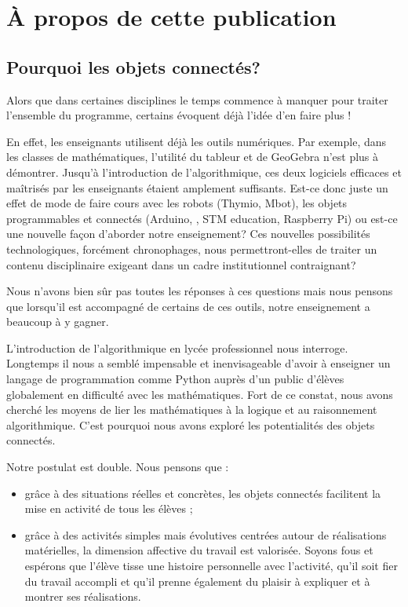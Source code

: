 \pagestyle{plain}

\section{À propos de cette publication}



\subsection{Pourquoi les objets connectés?}


Alors que dans certaines disciplines le temps commence à manquer pour traiter l'ensemble du programme, certains évoquent déjà l'idée d'en faire plus !

En effet, les enseignants utilisent déjà les outils numériques. Par exemple, dans les classes de mathématiques, l'utilité du tableur et de GeoGebra n'est plus à démontrer. Jusqu'à l'introduction de l'algorithmique, ces deux logiciels efficaces et maîtrisés par les enseignants étaient amplement suffisants.
Est-ce donc juste un effet de mode de faire cours avec les robots (Thymio, Mbot), les objets  programmables et connectés (Arduino, \mb, STM education, Raspberry Pi) ou est-ce une nouvelle façon d'aborder notre enseignement?
Ces nouvelles possibilités technologiques, forcément chronophages, nous permettront-elles de traiter un contenu disciplinaire exigeant dans un cadre institutionnel contraignant?

Nous n'avons bien sûr pas toutes les réponses à ces questions mais nous pensons que lorsqu'il est accompagné de certains de ces outils, notre enseignement a beaucoup à y gagner.

L'introduction de l'algorithmique en lycée professionnel nous interroge. Longtemps il nous a semblé impensable et inenvisageable d'avoir à enseigner un langage de programmation comme Python auprès d'un public d'élèves globalement en difficulté avec les mathématiques. Fort de ce constat, nous avons cherché les moyens de lier les mathématiques à la logique et au raisonnement algorithmique. C'est pourquoi nous avons exploré les potentialités des objets connectés.


\begin{formule}
	Notre postulat est double. Nous pensons que :
		\begin{itemize}
			\item grâce à des situations réelles et concrètes, les objets connectés facilitent la mise en activité de tous les élèves ;
			\item grâce à des activités simples mais évolutives centrées autour de réalisations matérielles, la dimension affective du travail est valorisée.  Soyons fous et espérons que l'élève tisse une histoire personnelle avec l'activité, qu'il soit fier du travail accompli et  qu'il prenne également du plaisir à expliquer et à montrer ses réalisations.
	\end{itemize}
\end{formule}



